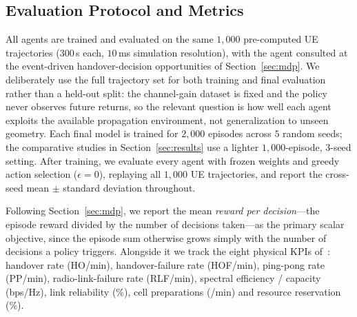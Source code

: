 \documentclass[conference]{IEEEtran}
\begin{document}
\subsection{Evaluation Protocol and Metrics}
All agents are trained and evaluated on the same $1{,}000$ pre-computed UE
trajectories ($300$\,s each, $10$\,ms simulation resolution), with the agent
consulted at the event-driven handover-decision opportunities of
Section~\ref{sec:mdp}. We deliberately use the full trajectory set for both
training and final evaluation rather than a held-out split: the channel-gain
dataset is fixed and the policy never observes future returns, so the relevant
question is how well each agent exploits the available propagation environment,
not generalization to unseen geometry. Each final model is trained for $2{,}000$
episodes across $5$ random seeds; the comparative studies in
Section~\ref{sec:results} use a lighter $1{,}000$-episode, $3$-seed setting. After
training, we evaluate every agent with frozen weights and greedy action selection
($\epsilon{=}0$), replaying all $1{,}000$ UE trajectories, and report the
cross-seed mean $\pm$ standard deviation throughout.

Following Section~\ref{sec:mdp}, we report the mean \emph{reward per decision}---the
episode reward divided by the number of decisions taken---as the primary scalar
objective, since the episode sum otherwise grows simply with the number of
decisions a policy triggers. Alongside it we track the eight physical KPIs
of~\cite{cmab_ho}: handover rate (HO/min), handover-failure rate (HOF/min),
ping-pong rate (PP/min), radio-link-failure rate (RLF/min), spectral efficiency /
capacity (bps/Hz), link reliability (\%), cell preparations (/min) and resource
reservation (\%).
\end{document}
